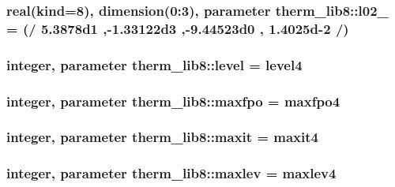 \subsubsection[{l02\+\_\+108}]{\setlength{\rightskip}{0pt plus 5cm}real(kind=8), dimension(0\+:3), parameter therm\+\_\+lib8\+::l02\+\_ = (/ 5.\+3878d1 ,-\/1.\+33122d3 ,-\/9.\+44523d0 , 1.\+4025d-\/2 /)}\label{namespacetherm__lib8_ab6c640a78c761844912d94aac7c317b8}
\hypertarget{namespacetherm__lib8_a5aa70fb6d66e28229c98896efb7d03d9}{}
\subsubsection[{level}]{\setlength{\rightskip}{0pt plus 5cm}integer, parameter therm\+\_\+lib8\+::level = level4}\label{namespacetherm__lib8_a5aa70fb6d66e28229c98896efb7d03d9}
\hypertarget{namespacetherm__lib8_ae43667eb586a48e36ec5508be0a58153}{}
\subsubsection[{maxfpo}]{\setlength{\rightskip}{0pt plus 5cm}integer, parameter therm\+\_\+lib8\+::maxfpo = maxfpo4}\label{namespacetherm__lib8_ae43667eb586a48e36ec5508be0a58153}
\hypertarget{namespacetherm__lib8_a1fff65e6f008a88c6c8ebecbc85f518c}{}
\subsubsection[{maxit}]{\setlength{\rightskip}{0pt plus 5cm}integer, parameter therm\+\_\+lib8\+::maxit = maxit4}\label{namespacetherm__lib8_a1fff65e6f008a88c6c8ebecbc85f518c}
\hypertarget{namespacetherm__lib8_a8608aff039402524592e0c7b6cdeac27}{}
\subsubsection[{maxlev}]{\setlength{\rightskip}{0pt plus 5cm}integer, parameter therm\+\_\+lib8\+::maxlev = maxlev4}\label{namespacetherm__lib8_a8608aff039402524592e0c7b6cdeac27}
\hypertarget{namespacetherm__lib8_acf7c73667b035fd1eb6ab1d3924e941e}{}
